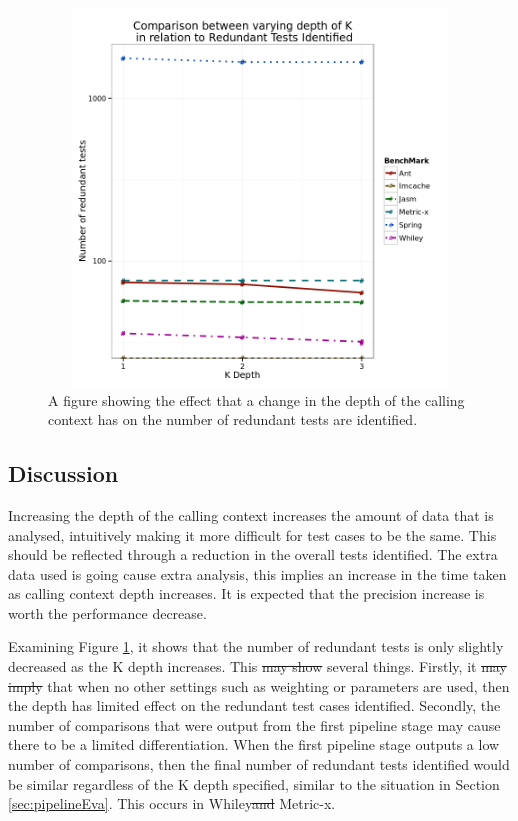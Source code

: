 \documentclass[11pt
              , a4paper
              , twoside
              , openright
              ]{report}
\providecommand{\DIFadd}[1]{{\protect\color{blue}\uwave{#1}}} %
\providecommand{\DIFdel}[1]{{\protect\color{red}\sout{#1}}}                      %
\providecommand{\DIFaddbegin}{} %
\providecommand{\DIFaddend}{} %
\providecommand{\DIFdelbegin}{} %
\providecommand{\DIFdelend}{} %
\begin{document}
\begin{figure}[h]
\begin{center}
\includegraphics[height=10cm, width = 14.5cm]{KDepth.png}
\end{center}
\caption{A figure showing the effect that a change in the depth of the calling context has on the number of redundant tests are identified.}
\label{fig:kdepthgraph}
\end{figure}

\subsection{Discussion}
Increasing the depth of the calling context increases the amount of data that is analysed, intuitively making it more difficult for test cases to be the same. This should be reflected through a reduction in the overall tests identified. The extra data used is going cause extra analysis, this implies an increase in the time taken as calling context depth increases. It is expected that the precision increase is worth the performance decrease.

Examining Figure \ref{fig:kdepthgraph}, it shows that the number of redundant tests is only slightly decreased as the K depth increases. This \DIFdelbegin \DIFdel{may show }\DIFdelend \DIFaddbegin \DIFadd{shows }\DIFaddend several things. Firstly, it \DIFdelbegin \DIFdel{may imply }\DIFdelend \DIFaddbegin \DIFadd{implies }\DIFaddend that when no other settings such as weighting or parameters are used, then the depth has limited effect on the redundant test cases identified. Secondly, the number of comparisons that were output from the first pipeline stage may cause there to be a limited differentiation. When the first pipeline stage outputs a low number of comparisons, then the final number of redundant tests identified would be similar regardless of the K depth specified, similar to the situation in Section \ref{sec:pipelineEva}. This occurs in Whiley\DIFdelbegin \DIFdel{and }\DIFdelend \DIFaddbegin \DIFadd{, }\DIFaddend Metric-x\DIFaddbegin \DIFadd{, Imcache and Jasm}\DIFaddend . 
\end{document}
